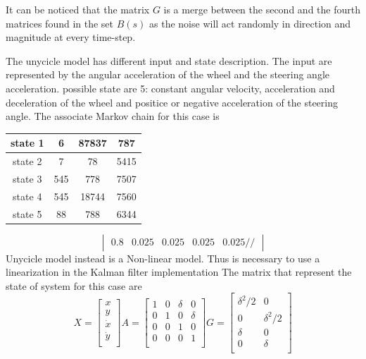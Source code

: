 \documentclass[twocolumn]{article}
\begin{document}
    
    It can be noticed that the matrix $G$ is a merge between the second and the fourth matrices found in the set $B(s)$ as the noise will act
    randomly in direction and magnitude at every time-step.

    The unycicle model has different input and state description. The input are represented by the angular acceleration of the wheel and the steering angle acceleration.
    possible state are 5: constant angular velocity, acceleration and deceleration of the wheel and positice or negative acceleration of the steering angle.
    The associate Markov chain for this case is
    \begin{tabular}{||c c c c||}
        \hline
        state 1 & 6      & 87837  & 787    \\
        \hline
        state 2  & 7      & 78     & 5415   \\
        \hline
        state 3      & 545    & 778    & 7507   \\
        \hline
        state 4      & 545    & 18744  & 7560   \\
        \hline
        state 5      & 88     & 788    & 6344   \\ [1ex]
        \hline
    \end{tabular}
    $$\begin{vmatrix}
            0.8 & 0.025 & 0.025 & 0.025 & 0.025 //
        \end{vmatrix}$$
    Unycicle model instead is a Non-linear model. Thus is necessary to use a linearization in the Kalman filter implementation
    The matrix that represent the state of system for this case are
    \[ X=\begin{bmatrix} x \\ y \\ \dot{x} \\ \dot{y} \\ \end{bmatrix}  A=\begin{bmatrix}
            1 & 0 & \delta & 0      \\
            0 & 1 & 0      & \delta \\
            0 & 0 & 1      & 0      \\
            0 & 0 & 0      & 1      \\
        \end{bmatrix}
        G=\begin{bmatrix}
            \delta^2/2 & 0          \\
            0          & \delta^2/2 \\
            \delta     & 0          \\
            0          & \delta     \\
        \end{bmatrix}
    \]
\end{document}

